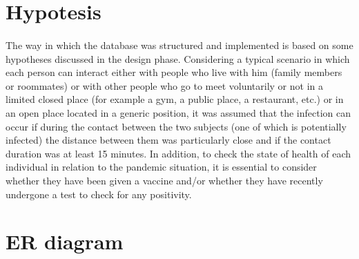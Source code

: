 \documentclass[a4paper,12pt]{article}
\begin{document}
\section{Hypotesis}
\paragraph{} The way in which the database was structured and implemented is based on some hypotheses discussed in the design phase. Considering a typical scenario in which each person can interact either with people who live with him (family members or roommates) or with other people who go to meet voluntarily or not in a limited closed place (for example a gym, a public place, a restaurant, etc.) or in an open place located in a generic position, it was assumed that the infection can occur if during the contact between the two subjects (one of which is potentially infected) the distance between them was particularly close and if the contact duration was at least 15 minutes. In addition, to check the state of health of each individual in relation to the pandemic situation, it is essential to consider whether they have been given a vaccine and/or whether they have recently undergone a test to check for any positivity.
\clearpage
\section{ER diagram}
\end{document}
